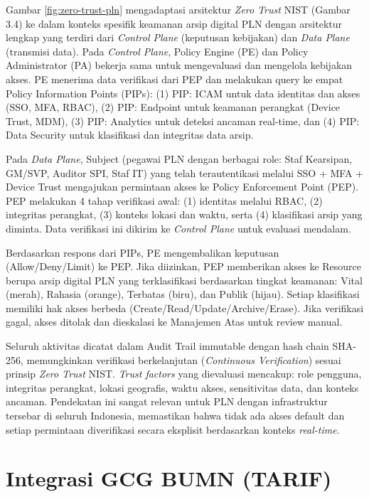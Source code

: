 \documentclass[12pt,a4paper]{report}
\begin{document}
\small Gambar \ref{fig:zero-trust-pln} mengadaptasi arsitektur \textit{Zero Trust} NIST (Gambar 3.4) ke dalam konteks spesifik keamanan arsip digital PLN dengan arsitektur lengkap yang terdiri dari \textit{Control Plane} (keputusan kebijakan) dan \textit{Data Plane} (transmisi data). Pada \textit{Control Plane}, Policy Engine (PE) dan Policy Administrator (PA) bekerja sama untuk mengevaluasi dan mengelola kebijakan akses. PE menerima data verifikasi dari PEP dan melakukan query ke empat Policy Information Points (PIPs): (1) PIP: ICAM untuk data identitas dan akses (SSO, MFA, RBAC), (2) PIP: Endpoint untuk keamanan perangkat (Device Trust, MDM), (3) PIP: Analytics untuk deteksi ancaman real-time, dan (4) PIP: Data Security untuk klasifikasi dan integritas data arsip.

Pada \textit{Data Plane}, Subject (pegawai PLN dengan berbagai role: Staf Kearsipan, GM/SVP, Auditor SPI, Staf IT) yang telah terautentikasi melalui SSO + MFA + Device Trust mengajukan permintaan akses ke Policy Enforcement Point (PEP). PEP melakukan 4 tahap verifikasi awal: (1) identitas melalui RBAC, (2) integritas perangkat, (3) konteks lokasi dan waktu, serta (4) klasifikasi arsip yang diminta. Data verifikasi ini dikirim ke \textit{Control Plane} untuk evaluasi mendalam.

Berdasarkan respons dari PIPs, PE mengembalikan keputusan (Allow/Deny/Limit) ke PEP. Jika diizinkan, PEP memberikan akses ke Resource berupa arsip digital PLN yang terklasifikasi berdasarkan tingkat keamanan: Vital (merah), Rahasia (orange), Terbatas (biru), dan Publik (hijau). Setiap klasifikasi memiliki hak akses berbeda (Create/Read/Update/Archive/Erase). Jika verifikasi gagal, akses ditolak dan dieskalasi ke Manajemen Atas untuk review manual.

Seluruh aktivitas dicatat dalam Audit Trail immutable dengan hash chain SHA-256, memungkinkan verifikasi berkelanjutan (\textit{Continuous Verification}) sesuai prinsip \textit{Zero Trust} NIST. \textit{Trust factors} yang dievaluasi mencakup: role pengguna, integritas perangkat, lokasi geografis, waktu akses, sensitivitas data, dan konteks ancaman. Pendekatan ini sangat relevan untuk PLN dengan infrastruktur tersebar di seluruh Indonesia, memastikan bahwa tidak ada akses default dan setiap permintaan diverifikasi secara eksplisit berdasarkan konteks \textit{real-time}.


\section{Integrasi GCG BUMN (TARIF)}
\end{document}
